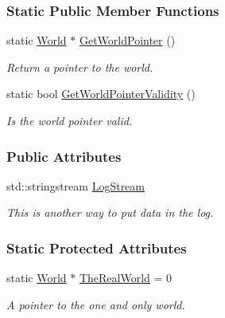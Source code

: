 \subsubsection*{Static Public Member Functions}
\begin{DoxyCompactItemize}
\item 
static \hyperlink{classMezzanine_1_1World}{World} $\ast$ \hyperlink{classMezzanine_1_1World_a8d714f7655aa563cd66cee8db59f9116}{GetWorldPointer} ()
\begin{DoxyCompactList}\small\item\em Return a pointer to the world. \item\end{DoxyCompactList}\item 
static bool \hyperlink{classMezzanine_1_1World_a98370ba288303e706826cd80401baed9}{GetWorldPointerValidity} ()
\begin{DoxyCompactList}\small\item\em Is the world pointer valid. \item\end{DoxyCompactList}\end{DoxyCompactItemize}
\subsubsection*{Public Attributes}
\begin{DoxyCompactItemize}
\item 
std::stringstream \hyperlink{classMezzanine_1_1World_a32b1c4de1bbf5495452e463802ffa499}{LogStream}
\begin{DoxyCompactList}\small\item\em This is another way to put data in the log. \item\end{DoxyCompactList}\end{DoxyCompactItemize}
\subsubsection*{Static Protected Attributes}
\begin{DoxyCompactItemize}
\item 
\hypertarget{classMezzanine_1_1World_a86c5d362a144d6cad245fd022f512b21}{
static \hyperlink{classMezzanine_1_1World}{World} $\ast$ \hyperlink{classMezzanine_1_1World_a86c5d362a144d6cad245fd022f512b21}{TheRealWorld} = 0}
\label{classMezzanine_1_1World_a86c5d362a144d6cad245fd022f512b21}

\begin{DoxyCompactList}\small\item\em A pointer to the one and only world. \item\end{DoxyCompactList}\end{DoxyCompactItemize}


